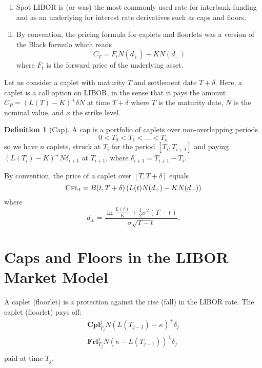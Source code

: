 \documentclass[10pt, oneside, reqno]{amsbook}
\theoremstyle{plain}%
\theoremstyle{definition}
\newtheorem{defn}[thm]{Definition}
\theoremstyle{remark}
\numberwithin{equation}{chapter}
\begin{document}
\begin{enumerate}[(i)]
    \item Spot LIBOR is (or was) the most commonly used rate for interbank funding and as an underlying for interest rate derivatives such as caps and floors.  
    \item By convention, the pricing formula for caplets and floorlets was a version of the Black formula which reads \[
        C_T = F_t N(d_+) - K N(d_-)
    \] where $F_t$ is the forward price of the underlying asset. 
\end{enumerate}


Let us consider a caplet with maturity $T$ and settlement date $T + \delta$.  Here, a caplet is a call option on LIBOR, in the sense that it pays the amount $C_P = (L(T) - K)^+ \delta N$ at time $T + \delta$ where $T$ is the maturity date, $N$ is the nominal value, and $x$ the strike level.  

\begin{defn}[Cap]
     A cap is a portfolio of caplets over non-overlapping periods \[
        0 < T_0 < T_1 < \dots < T_n 
     \] so we have $n$ caplets, struck at $T_{i}$ for the period $[T_i, T_{i+1}]$ and paying $(L(T_i) - K)^+ N \delta_{i+1}$ at $T_{i+1}$, where $\delta_{i+1} = T_{i+1} - T_i$.
\end{defn}


By convention, the price of a caplet over $[T, T+\delta]$ equals \[
    \textsc{Cpl}_t = B(t, T+\delta) \left( L(t) N(d_+) - KN(d_-)\right)
\] where \[
    d_\pm = \frac{\ln \frac{L(t)}{K} \pm \frac{1}{2} \sigma^2(T-t)}{\sigma \sqrt{T-t}}.
\]


  

\section{Caps and Floors in the LIBOR Market Model} %
\label{sec:caps_and_floors_in_the_libor_market_model}

A caplet (floorlet) is a protection against the rise (fall) in the LIBOR rate. The caplet (floorlet) pays off: \begin{align*}
    \mathbf{Cpl}^j_{T_j}    N\left( L(T_{j-1}) - \kappa\right)^+ \delta_j \\
    \mathbf{Frl}^j_{T_j}    N\left(  \kappa - L(T_{j-1}) \right)^+ \delta_j \\
\end{align*} paid at time $T_j$.  
\end{document}

